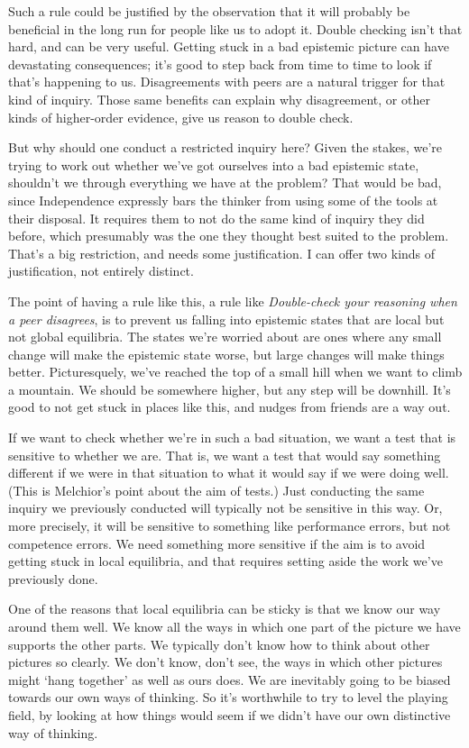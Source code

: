 \documentclass[
  10pt,
  letterpaper,
  twoside]{scrbook}
\begin{document}
Such a rule could be justified by the observation that it will probably
be beneficial in the long run for people like us to adopt it. Double
checking isn't that hard, and can be very useful. Getting stuck in a bad
epistemic picture can have devastating consequences; it's good to step
back from time to time to look if that's happening to us. Disagreements
with peers are a natural trigger for that kind of inquiry. Those same
benefits can explain why disagreement, or other kinds of higher-order
evidence, give us reason to double check.

But why should one conduct a restricted inquiry here? Given the stakes,
we're trying to work out whether we've got ourselves into a bad
epistemic state, shouldn't we through everything we have at the problem?
That would be bad, since Independence expressly bars the thinker from
using some of the tools at their disposal. It requires them to not do
the same kind of inquiry they did before, which presumably was the one
they thought best suited to the problem. That's a big restriction, and
needs some justification. I can offer two kinds of justification, not
entirely distinct.

The point of having a rule like this, a rule like \emph{Double-check
your reasoning when a peer disagrees}, is to prevent us falling into
epistemic states that are local but not global equilibria. The states
we're worried about are ones where any small change will make the
epistemic state worse, but large changes will make things better.
Picturesquely, we've reached the top of a small hill when we want to
climb a mountain. We should be somewhere higher, but any step will be
downhill. It's good to not get stuck in places like this, and nudges
from friends are a way out.

If we want to check whether we're in such a bad situation, we want a
test that is sensitive to whether we are. That is, we want a test that
would say something different if we were in that situation to what it
would say if we were doing well. (This is Melchior's point about the aim
of tests.) Just conducting the same inquiry we previously conducted will
typically not be sensitive in this way. Or, more precisely, it will be
sensitive to something like performance errors, but not competence
errors. We need something more sensitive if the aim is to avoid getting
stuck in local equilibria, and that requires setting aside the work
we've previously done.

One of the reasons that local equilibria can be sticky is that we know
our way around them well. We know all the ways in which one part of the
picture we have supports the other parts. We typically don't know how to
think about other pictures so clearly. We don't know, don't see, the
ways in which other pictures might `hang together' as well as ours does.
We are inevitably going to be biased towards our own ways of thinking.
So it's worthwhile to try to level the playing field, by looking at how
things would seem if we didn't have our own distinctive way of thinking.
\end{document}
